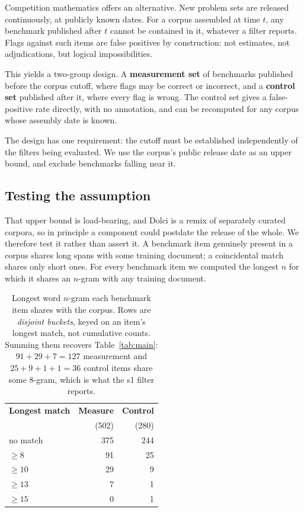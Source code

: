\documentclass[11pt]{article}
\begin{document}
Competition mathematics offers an alternative. New problem sets are released
continuously, at publicly known dates. For a corpus assembled at time $t$, any
benchmark published after $t$ cannot be contained in it, whatever a filter
reports. Flags against such items are false positives by construction: not
estimates, not adjudications, but logical impossibilities.

This yields a two-group design. A \textbf{measurement set} of benchmarks
published before the corpus cutoff, where flags may be correct or incorrect, and
a \textbf{control set} published after it, where every flag is wrong. The control
set gives a false-positive rate directly, with no annotation, and can be
recomputed for any corpus whose assembly date is known.

The design has one requirement: the cutoff must be established independently of
the filters being evaluated. We use the corpus's public release date as an upper
bound, and exclude benchmarks falling near it.

\subsection{Testing the assumption}
\label{sec:validate}

That upper bound is load-bearing, and Dolci is a remix of separately curated
corpora, so in principle a component could postdate the release of the whole. We
therefore test it rather than assert it. A benchmark item genuinely present in a
corpus shares long spans with some training document; a coincidental match shares
only short ones. For every benchmark item we computed the longest $n$ for which it
shares an $n$-gram with any training document.

\begin{table}[h]
\centering
\small
\begin{tabular}{lrr}
\toprule
\textbf{Longest match} & \textbf{Measure} & \textbf{Control} \\
 & (502) & (280) \\
\midrule
no match      & 375 & 244 \\
$\geq 8$      &  91 &  25 \\
$\geq 10$     &  29 &   9 \\
$\geq 13$     &   7 &   1 \\
$\geq 15$     &   0 &   1 \\
\bottomrule
\end{tabular}
\caption{Longest word $n$-gram each benchmark item shares with the corpus.
Rows are \emph{disjoint buckets}, keyed on an item's longest match, not cumulative
counts. Summing them recovers Table~\ref{tab:main}: $91{+}29{+}7 = 127$ measurement
and $25{+}9{+}1{+}1 = 36$ control items share some 8-gram, which is what the s1
filter reports.}
\label{tab:validate}
\end{table}
\end{document}
